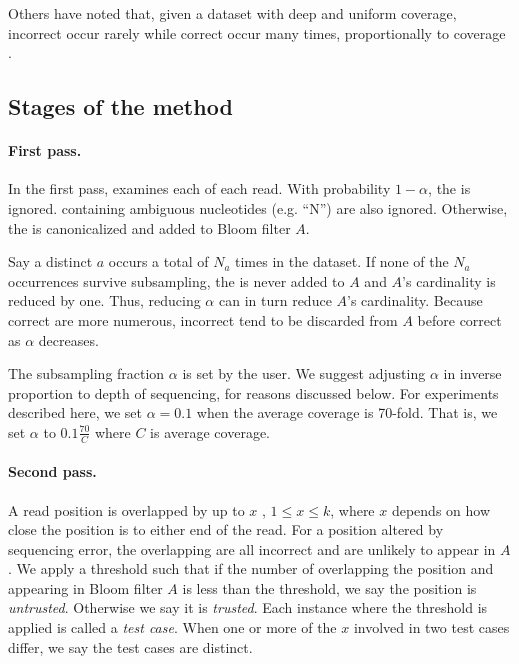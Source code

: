 \documentclass{bmcart}
\begin{document}
Others have noted that, given a dataset with deep and uniform coverage, incorrect \kmers occur rarely while correct \kmers occur many times, proportionally to coverage \cite{pevzner2001eulerian, chaisson2004fragment}.

\subsection*{Stages of the method}
\paragraph{First pass.}    In the first pass, \tool examines each \kmer of each read.  With probability $1 - \alpha$, the \kmer is ignored.  \kmers containing ambiguous nucleotides (e.g. ``N'') are also ignored.  Otherwise, the \kmer is canonicalized and added to Bloom filter $A$.

Say a distinct \kmer $a$ occurs a total of $N_a$ times in the dataset.  If none of the $N_a$ occurrences survive subsampling, the \kmer is never added to $A$ and $A$'s cardinality is reduced by one.  Thus, reducing $\alpha$ can in turn reduce $A$'s cardinality.  Because correct \kmers are more numerous, incorrect \kmers tend to be discarded from $A$ before correct \kmers as $\alpha$ decreases.

The subsampling fraction $\alpha$ is set by the user.  We suggest adjusting $\alpha$ in inverse proportion to depth of sequencing, for reasons discussed below.  For experiments described here, we set $\alpha=0.1$ when the average coverage is 70-fold.  That is, we set $\alpha$ to $0.1\frac{70}{C}$ where $C$ is average coverage.

\paragraph{Second pass.} 
A read position is overlapped by up to $x$ \kmers, $1\le x\le k$, where $x$ depends on how close the position is to either end of the read.
For a position altered by sequencing error, the overlapping \kmers are all incorrect and are unlikely to appear in $A$.
We apply a threshold such that if the number of \kmers overlapping the position and appearing in Bloom filter $A$ is less than the threshold, we say the position is \emph{untrusted}.
Otherwise we say it is \emph{trusted}.
Each instance where the threshold is applied is called a \emph{test case}.
When one or more of the $x$ \kmers involved in two test cases differ, we say the test cases are distinct.
\end{document}
